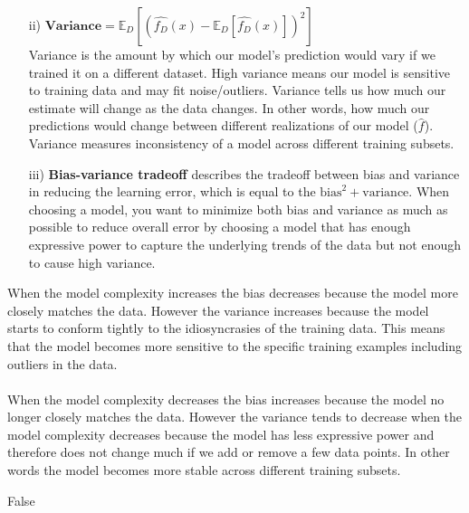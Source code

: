 \documentclass{article}
\begin{document}
\begin{aprob}
\begin{tcolorbox}[colback=lightgray!10!white, colframe=black, title=A1.a]
\begin{enumerate}
            \item[ii)] $\textbf{Variance} = \mathbb{E}_D\left[ \left( \hat{f_D}(x) - \mathbb{E}_D[\hat{f_D}(x)] \right)^2 \right]$ \\
            Variance is the amount by which our model’s prediction would vary if we trained it on a different dataset. High variance means
            our model is sensitive to training data and may fit noise/outliers. Variance tells us how much our estimate will change as the
            data changes. In other words, how much our predictions would change between different realizations of our model ($\hat{f}$).
            Variance measures inconsistency of a model across different training subsets.

            \item[iii)] \textbf{Bias-variance tradeoff} describes the tradeoff between bias and variance in reducing the learning error,
            which is equal to the $\text{bias}^2 + \text{variance}$. When choosing a model, you want to minimize both bias and variance
            as much as possible to reduce overall error by choosing a model that has enough expressive power to capture the underlying trends
            of the data but not enough to cause high variance.
        \end{enumerate}
    \end{tcolorbox}
    \begin{tcolorbox}[colback=lightgray!10!white, colframe=black, title=A1.b]
        When the model complexity increases the bias decreases because the model more
        closely matches the data. However the variance increases because the
        model starts to conform tightly to the idiosyncrasies of the training data. This
        means that the model becomes more sensitive to the specific training examples including outliers
        in the data. \\\\
        When the model complexity decreases the bias increases because the model no longer closely
        matches the data. However the variance tends to decrease when the model complexity decreases
        because the model has less expressive power and therefore does not change much if we add or
        remove a few data points. In other words the model becomes more stable across different training subsets.
    \end{tcolorbox}
    \begin{tcolorbox}[colback=lightgray!10!white, colframe=black, title=A1.c]
        False \\\\

\end{tcolorbox}
\end{aprob}
\end{document}
